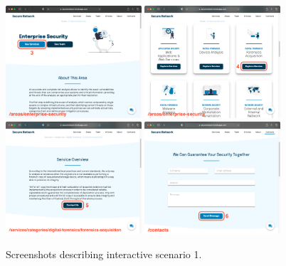 \documentclass[12pt]{report}
\begin{document}
\begin{figure}[H]
	\centering
	\includegraphics[width=0.45\textwidth]{scenarios/1/3.png}
	\includegraphics[width=0.45\textwidth]{scenarios/1/4.png}
	\includegraphics[width=0.45\textwidth]{scenarios/1/5.png}
	\includegraphics[width=0.45\textwidth]{scenarios/1/6.png}
	\caption{Screenshots describing interactive scenario 1.}
\end{figure}

\clearpage
\end{document}
